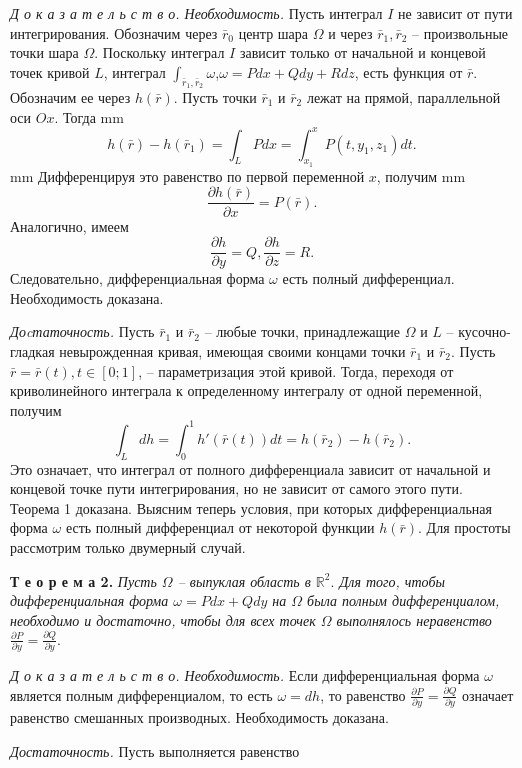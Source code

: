 \documentclass[12pt,titlepage]{report}
\begin{document}
\par\textit{Д о к а з а т е л ь с т в о. Необходимость.} Пусть интеграл $I$ не зависит от пути интегрирования. Обозначим  через $\bar{r}_{0}$ центр шара $\Omega$ и через $\bar{r}_{1}, \bar{r}_{2}$ -- произвольные точки шара $\Omega$. Поскольку интеграл $I$ зависит только от начальной и концевой точек кривой $L$, интеграл $\int_{\bar{r}_{1}, \bar{r}_{2}}\omega$,$\omega = Pdx+Qdy+Rdz$, есть функция от $\bar{r}$. Обозначим ее через $h(\bar{r})$. Пусть точки $\bar{r}_{1}$  и $\bar{r}_{2}$ лежат на прямой, параллельной оси $Ox$. Тогда
 mm
$$h(\bar{r})-h(\bar{r}_{1})=\int_L{Pdx}=\int_{x_{1}}^x P(t,y_{1},z_{1})dt.$$
 mm
Дифференцируя это равенство по первой переменной $x$, получим
 mm
$$\frac{\partial h(\bar{r})}{\partial x} = P(\bar{r}).$$
\vskip 5mm
Аналогично, имеем 
\vskip 3mm
$$\frac{\partial h}{\partial y} = Q, \frac{\partial h}{\partial z} = R.$$
\vskip 3mm
Следовательно, дифференциальная форма $\omega$ есть полный дифференциал. Необходимость доказана. 
\par \textit{Доcтаточность.} Пусть $\bar{r}_{1}$  и $\bar{r}_{2}$ -- любые точки, принадлежащие $\Omega$ и $L$ -- кусочно-гладкая невырожденная кривая, имеющая своими концами точки $\bar{r}_{1}$ и $\bar{r}_{2}$. Пусть $\bar{r}=\bar{r}(t),t\in[0;1]$, -- параметризация этой кривой. Тогда, переходя от криволинейного интеграла к определенному интегралу от одной переменной, получим
\vskip 5mm
$$\int_L dh=\int_0^1 h'(\bar{r}(t))dt=h(\bar{r}_{2})-h(\bar{r}_{2}).$$
\vskip 5mm
Это означает, что интеграл от полного дифференциала зависит от начальной и концевой точке пути интегрирования, но не зависит от самого этого пути. Теорема 1 доказана.
Выясним теперь условия, при которых дифференциальная форма $\omega$ есть полный дифференциал от некоторой функции $h(\bar{r})$. Для простоты рассмотрим только двумерный случай.
\par\textbf{Т е о р е м а 2.} \textit{Пусть $\Omega$ -- выпуклая область в $\mathbb{R}^2.$ Для того, чтобы дифференциальная форма $\omega=Pdx+Qdy$ на $\Omega$ была полным дифференциалом, необходимо и достаточно, чтобы для всех точек $\Omega$ выполнялось неравенство $\frac{\partial P}{\partial y}=\frac{\partial Q}{\partial y}.$ }
\par\textit{Д о к а з а т е л ь с т в о. Необходимость.}  Если дифференциальная форма $\omega$ является полным дифференциалом, то есть $\omega=dh$, то равенство $\frac{\partial P}{\partial y}=\frac{\partial Q}{\partial y}$ означает равенство смешанных производных. Необходимость доказана.
\par\textit{   Достаточность.}  Пусть выполняется равенство
\end{document}
